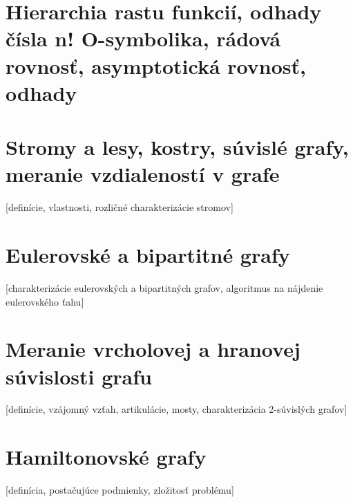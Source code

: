 \section {Hierarchia rastu funkcií, odhady čísla n! O-symbolika, rádová rovnosť, asymptotická rovnosť, odhady}

\section {Stromy a lesy, kostry, súvislé grafy, meranie vzdialeností v grafe} 
  [definície, vlastnosti, rozličné charakterizácie stromov]

\section {Eulerovské a bipartitné grafy}
  [charakterizácie eulerovských a bipartitných grafov, algoritmus na nájdenie eulerovského ťahu]

\section {Meranie vrcholovej a hranovej súvislosti grafu}
  [definície, vzájomný vzťah, artikulácie, mosty, charakterizácia 2-súvislých grafov] 

\section {Hamiltonovské grafy}
  [definícia, postačujúce podmienky, zložitosť problému] 
